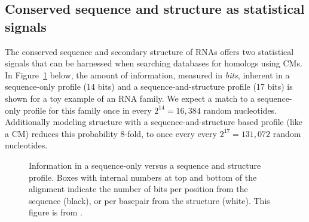 \documentclass[custom,landscape,final,30pt,plainboxedsections]{sciposter-titleskipsmall}
\begin{document}
\begin{multicols}{3}
\columnbreak

\section*{Conserved sequence and structure as statistical signals}
The conserved sequence and secondary structure of RNAs offers two
statistical signals that can be harnessed when searching
databases for homologs using CMs. In
Figure~\ref{fig:seqstructprofiles} below, the amount of information,
measured in \emph{bits}, inherent in a sequence-only profile (14
bits) and a sequence-and-structure profile (17 bits) is shown for a
toy example of an RNA family. We expect a match to a sequence-only
profile for this family once in every $2^{14}=16,384$ random
nucleotides.  Additionally modeling structure with a
sequence-and-structure based profile (like a CM) reduces this
probability 8-fold, to once every every $2^{17}=131,072$
random nucleotides.

\begin{footnotesize}
\begin{figure}
\caption{Information in a sequence-only versus a sequence and
  structure profile. 
  Boxes with internal numbers at top and bottom of
  the alignment indicate the number of bits per position from the
  sequence (black), or per basepair from the structure (white).
  This figure is from \cite{Nawrocki13}.
}
\label{fig:seqstructprofiles}
\end{figure}
\end{footnotesize}


\end{multicols}
\end{document}
